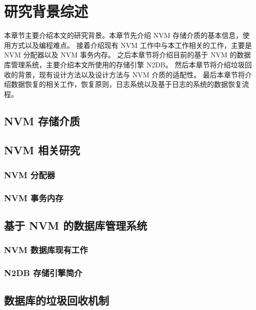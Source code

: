 
\chapter{研究背景综述}

本章节主要介绍本文的研究背景。本章节先介绍 NVM 存储介质的基本信息，使用方式以及编程难点。
接着介绍现有 NVM 工作中与本工作相关的工作，主要是 NVM 分配器以及 NVM 事务内存。
之后本章节将介绍目前的基于 NVM 的数据库管理系统，主要介绍本文所使用的存储引擎 N2DB。
然后本章节将介绍垃圾回收的背景，现有设计方法以及设计方法与 NVM 介质的适配性。
最后本章节将介绍数据恢复的相关工作，恢复原则，日志系统以及基于日志的系统的数据恢复流程。

\section{NVM 存储介质}

\section{NVM 相关研究}

\subsection{NVM 分配器}

\subsection{NVM 事务内存}

\section{基于 NVM 的数据库管理系统}

\subsection{NVM 数据库现有工作}

\subsection{N2DB 存储引擎简介}

\section{数据库的垃圾回收机制}

